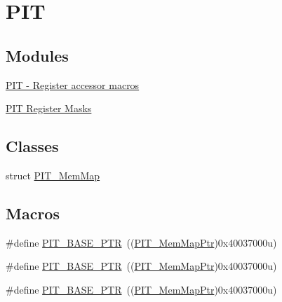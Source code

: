 \hypertarget{group___p_i_t___peripheral}{}\section{P\+IT}
\label{group___p_i_t___peripheral}
\subsection*{Modules}
\begin{DoxyCompactItemize}
\item 
\hyperlink{group___p_i_t___register___accessor___macros}{P\+I\+T -\/ Register accessor macros}
\item 
\hyperlink{group___p_i_t___register___masks}{P\+I\+T Register Masks}
\end{DoxyCompactItemize}
\subsection*{Classes}
\begin{DoxyCompactItemize}
\item 
struct \hyperlink{struct_p_i_t___mem_map}{P\+I\+T\+\_\+\+Mem\+Map}
\end{DoxyCompactItemize}
\subsection*{Macros}
\begin{DoxyCompactItemize}
\item 
\#define \hyperlink{group___p_i_t___peripheral_ga70be45f58402a8e6d2ce4df7b23aa41c}{P\+I\+T\+\_\+\+B\+A\+S\+E\+\_\+\+P\+TR}~((\hyperlink{group___p_i_t___peripheral_ga4efe9d2676c775562cb282254af9a937}{P\+I\+T\+\_\+\+Mem\+Map\+Ptr})0x40037000u)
\item 
\#define \hyperlink{group___p_i_t___peripheral_ga70be45f58402a8e6d2ce4df7b23aa41c}{P\+I\+T\+\_\+\+B\+A\+S\+E\+\_\+\+P\+TR}~((\hyperlink{group___p_i_t___peripheral_ga4efe9d2676c775562cb282254af9a937}{P\+I\+T\+\_\+\+Mem\+Map\+Ptr})0x40037000u)
\item 
\#define \hyperlink{group___p_i_t___peripheral_ga70be45f58402a8e6d2ce4df7b23aa41c}{P\+I\+T\+\_\+\+B\+A\+S\+E\+\_\+\+P\+TR}~((\hyperlink{group___p_i_t___peripheral_ga4efe9d2676c775562cb282254af9a937}{P\+I\+T\+\_\+\+Mem\+Map\+Ptr})0x40037000u)
\end{DoxyCompactItemize}
